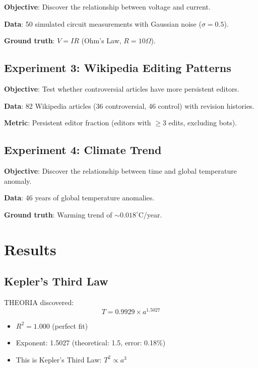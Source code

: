 \documentclass[journal,10pt]{IEEEtran}
\begin{document}
\textbf{Objective}: Discover the relationship between voltage and current.

\textbf{Data}: 50 simulated circuit measurements with Gaussian noise ($\sigma = 0.5$).

\textbf{Ground truth}: $V = IR$ (Ohm's Law, $R = 10\Omega$).

\subsection{Experiment 3: Wikipedia Editing Patterns}

\textbf{Objective}: Test whether controversial articles have more persistent editors.

\textbf{Data}: 82 Wikipedia articles (36 controversial, 46 control) with revision histories.

\textbf{Metric}: Persistent editor fraction (editors with $\geq 3$ edits, excluding bots).

\subsection{Experiment 4: Climate Trend}

\textbf{Objective}: Discover the relationship between time and global temperature anomaly.

\textbf{Data}: 46 years of global temperature anomalies.

\textbf{Ground truth}: Warming trend of $\sim 0.018^\circ$C/year.

\section{Results}

\subsection{Kepler's Third Law}

THEORIA discovered:
\begin{equation}
T = 0.9929 \times a^{1.5027}
\end{equation}

\begin{itemize}
\item $R^2 = 1.000$ (perfect fit)
\item Exponent: 1.5027 (theoretical: 1.5, error: 0.18\%)
\item This is Kepler's Third Law: $T^2 \propto a^3$
\end{itemize}
\end{document}
